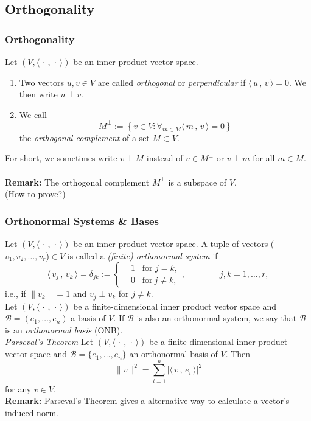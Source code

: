 \documentclass[12pt, t]{beamer}
\renewcommand{\emph}[1]{{\color{Turquoise3}\textsl{#1}}}
\newcommand{\myseries}[2]{$#1_1,#1_2,\dots,#1_#2$}
\newcommand{\nullspace}{~\\[15pt]}
\newcommand{\remark}{\textbf{Remark: }}
\newcommand{\scp}[2]{\langle\,#1\,,\,#2\,\rangle} \newcommand{\scpp}{\langle\,\cdot\,,\,\cdot\,\rangle}
\begin{document}
\subsection{Orthogonality}
\begin{frame}[allowframebreaks]
    \frametitle{Orthogonality}
    Let $(V,\scpp)$ be an inner product vector space.
    \begin{enumerate}[1.]
        \item Two vectors $u,v\in V$ are called \emph{orthogonal} or \emph{perpendicular} if $\scp{u}{v}=0$. We then write $u\perp v$.
        \item We call
              \begin{equation*}
                  M^{\perp}:=\left\{v\in V:\mathop{\forall}_{m\in M}\scp{m}{v}=0\right\}
              \end{equation*}
              the \emph{orthogonal complement} of a set $M\subset V$.
    \end{enumerate}
    For short, we sometimes write $v\perp M$ instead of $v\in M^{\perp}$ or $v\perp m$ for all $m\in M$.
    \nullspace
    \remark The orthogonal complement $M^{\perp}$ is a subspace of $V$.\\
    (How to prove?)
\end{frame}

\begin{frame}[allowframebreaks]
    \frametitle{Orthonormal Systems \& Bases}
    Let $(V,\scpp)$ be an inner product vector space. A tuple of vectors (\myseries{v}{r})$\in V$ is called a \emph{(finite) orthonormal system} if
    \begin{equation*}
        \scp{v_j}{v_k}=\delta_{jk}:=\left\{\begin{aligned}&1\;\;\;\text{for }j=k,\\&0\;\;\;\text{for}~j\neq k,\end{aligned}\right.,\qquad\qquad j,k=1,\ldots,r,
    \end{equation*}
    i.e., if $\|v_k\|=1$ and $v_j\perp v_k$ for $j\neq k$.
    \nullspace
    Let $(V,\scpp)$ be a finite-dimensional inner product vector space and $\mathcal{B}=(e_1,\ldots,e_n)$ a basis of $V$. If $\mathcal{B}$ is also an orthonormal system, we say that $\mathcal{B}$ is an \emph{orthonormal basis} (ONB).\\
    \newpage
    \emph{Parseval’s Theorem} Let $(V,\scpp)$ be a finite-dimensional inner product vector space and $\mathcal{B}=\{e_1,\ldots,e_n\}$ an orthonormal basis of $V$. Then
    \begin{equation*}
        \|v\|^2=\sum_{i=1}^{n}|\scp{v}{e_i}|^2
    \end{equation*}
    for any $v\in V$.
    \nullspace
    \remark Parseval’s Theorem gives a alternative way to calculate a vector's induced norm.
\end{frame}
\end{document}
